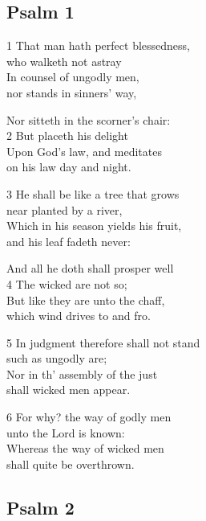 \subsection*{Psalm 1 }


1 That man hath perfect blessedness,\\
who walketh not astray\\
In counsel of ungodly men,\\
nor stands in sinners’ way,

Nor sitteth in the scorner’s chair:\\
2 But placeth his delight\\
Upon God’s law, and meditates\\
on his law day and night.

3 He shall be like a tree that grows\\
near planted by a river,\\
Which in his season yields his fruit,\\
and his leaf fadeth never:

And all he doth shall prosper well\\
4 The wicked are not so;\\
But like they are unto the chaff,\\
which wind drives to and fro.

5 In judgment therefore shall not stand \\
such as ungodly are; \\
Nor in th’ assembly of the just \\
shall wicked men appear.

6 For why? the way of godly men \\
unto the Lord is known:\\
Whereas the way of wicked men \\
shall quite be overthrown.

\begin{center}
\quad{}\quad{}
\end{center}

\subsection*{Psalm 2 }

